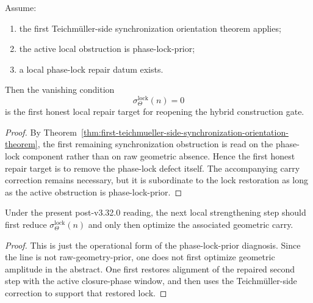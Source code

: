 \begin{lemma}
\label{lem:first-local-phase-lock-repair-lemma}
Assume:
\begin{enumerate}[leftmargin=2em,label=(\alph*)]
  \item the first Teichm\"uller-side synchronization orientation theorem applies;
  \item the active local obstruction is phase-lock-prior;
  \item a local phase-lock repair datum exists.
\end{enumerate}
Then the vanishing condition
\[
  \sigma_{\Theta}^{\mathrm{lock}}(n)=0
\]
is the first honest local repair target for reopening the hybrid construction gate.
\end{lemma}

\begin{proof}
By Theorem~\ref{thm:first-teichmueller-side-synchronization-orientation-theorem}, the first remaining synchronization obstruction is read on the phase-lock component rather than on raw geometric absence. Hence the first honest repair target is to remove the phase-lock defect itself. The accompanying carry correction remains necessary, but it is subordinate to the lock restoration as long as the active obstruction is phase-lock-prior.
\end{proof}

\begin{proposition}
\label{prop:current-line-supports-phase-lock-prior-local-repair}
Under the present post-v3.32.0 reading, the next local strengthening step should first reduce $\sigma_{\Theta}^{\mathrm{lock}}(n)$ and only then optimize the associated geometric carry.
\end{proposition}

\begin{proof}
This is just the operational form of the phase-lock-prior diagnosis. Since the line is not raw-geometry-prior, one does not first optimize geometric amplitude in the abstract. One first restores alignment of the repaired second step with the active closure-phase window, and then uses the Teichm\"uller-side correction to support that restored lock.
\end{proof}

